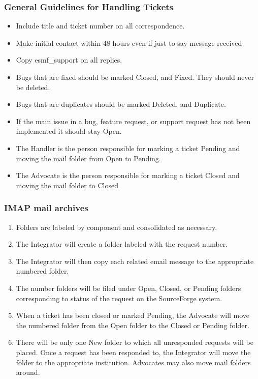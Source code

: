 \subsubsection{General Guidelines for Handling Tickets}
\begin{itemize}
\item Include title and ticket number on all correspondence.
\item Make initial contact within 48 hours even if just to say message received
\item Copy esmf\_support on all replies.
\item Bugs that are fixed should be marked Closed, and Fixed. They should never be deleted. 
\item Bugs that are duplicates should be marked Deleted, and Duplicate. 
\item If the main issue in a bug, feature request, or support request has not been implemented it should stay Open.
\item The Handler is the person responsible for marking a ticket Pending and moving the mail folder from Open to Pending.
\item The Advocate is the person responsible for marking a ticket Closed and moving the mail folder to Closed
\end{itemize}

\subsubsection{IMAP mail archives}
\begin{enumerate}
\item Folders are labeled by component and consolidated as necessary.
\item The Integrator will create a folder labeled with the request number. 
\item The Integrator will then copy each related email message to the appropriate 
numbered folder. 
\item The number folders will be filed under Open, Closed, or Pending folders 
corresponding to status of the request on the SourceForge system.
\item When a ticket has been closed or marked Pending, the Advocate will move the numbered folder from the Open folder to the Closed or Pending folder.
\item There will be only one New folder to which all unresponded requests will be placed. Once a request has been responded to, the Integrator will move the folder to the appropriate institution. Advocates may also move mail folders around.
\end{enumerate}

